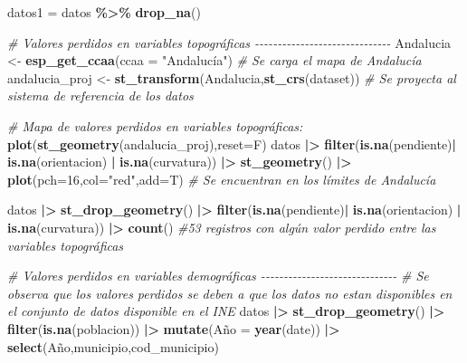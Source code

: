\documentclass[12pt,a4paper,]{book}
\newenvironment{Shaded}{\begin{snugshade}}{\end{snugshade}}
\newcommand{\AttributeTok}[1]{\textcolor[rgb]{0.13,0.29,0.53}{#1}}
\newcommand{\CommentTok}[1]{\textcolor[rgb]{0.56,0.35,0.01}{\textit{#1}}}
\newcommand{\DecValTok}[1]{\textcolor[rgb]{0.00,0.00,0.81}{#1}}
\newcommand{\FunctionTok}[1]{\textcolor[rgb]{0.13,0.29,0.53}{\textbf{#1}}}
\newcommand{\NormalTok}[1]{#1}
\newcommand{\OtherTok}[1]{\textcolor[rgb]{0.56,0.35,0.01}{#1}}
\newcommand{\SpecialCharTok}[1]{\textcolor[rgb]{0.81,0.36,0.00}{\textbf{#1}}}
\newcommand{\StringTok}[1]{\textcolor[rgb]{0.31,0.60,0.02}{#1}}
\numberwithin{dummy}{section}
\theoremstyle{ocrenumbox}
\theoremstyle{blacknumex}
\theoremstyle{blacknumbox}
\theoremstyle{ocrenum}
\theoremstyle{ocrenum}
\begin{document}
\begin{Shaded}
\begin{Highlighting}[]
\NormalTok{datos1 }\OtherTok{=}\NormalTok{ datos }\SpecialCharTok{\%\textgreater{}\%} \FunctionTok{drop\_na}\NormalTok{()}

\CommentTok{\# Valores perdidos en variables topográficas {-}{-}{-}{-}{-}{-}{-}{-}{-}{-}{-}{-}{-}{-}{-}{-}{-}{-}{-}{-}{-}{-}{-}{-}{-}{-}{-}{-}{-}{-}}
\NormalTok{Andalucia }\OtherTok{\textless{}{-}} \FunctionTok{esp\_get\_ccaa}\NormalTok{(}\AttributeTok{ccaa =} \StringTok{"Andalucía"}\NormalTok{) }\CommentTok{\# Se carga el mapa de Andalucía}
\NormalTok{andalucia\_proj }\OtherTok{\textless{}{-}} \FunctionTok{st\_transform}\NormalTok{(Andalucia,}\FunctionTok{st\_crs}\NormalTok{(dataset)) }\CommentTok{\# Se proyecta al sistema de referencia de los datos}

\CommentTok{\# Mapa de valores perdidos en variables topográficas:}
\FunctionTok{plot}\NormalTok{(}\FunctionTok{st\_geometry}\NormalTok{(andalucia\_proj),}\AttributeTok{reset=}\NormalTok{F)}
\NormalTok{datos }\SpecialCharTok{|\textgreater{}} 
  \FunctionTok{filter}\NormalTok{(}\FunctionTok{is.na}\NormalTok{(pendiente)}\SpecialCharTok{|} \FunctionTok{is.na}\NormalTok{(orientacion) }\SpecialCharTok{|} \FunctionTok{is.na}\NormalTok{(curvatura)) }\SpecialCharTok{|\textgreater{}} 
  \FunctionTok{st\_geometry}\NormalTok{() }\SpecialCharTok{|\textgreater{}} 
  \FunctionTok{plot}\NormalTok{(}\AttributeTok{pch=}\DecValTok{16}\NormalTok{,}\AttributeTok{col=}\StringTok{"red"}\NormalTok{,}\AttributeTok{add=}\NormalTok{T) }\CommentTok{\# Se encuentran en los límites de Andalucía}

\NormalTok{datos }\SpecialCharTok{|\textgreater{}} 
  \FunctionTok{st\_drop\_geometry}\NormalTok{() }\SpecialCharTok{|\textgreater{}} 
  \FunctionTok{filter}\NormalTok{(}\FunctionTok{is.na}\NormalTok{(pendiente)}\SpecialCharTok{|} \FunctionTok{is.na}\NormalTok{(orientacion) }\SpecialCharTok{|} \FunctionTok{is.na}\NormalTok{(curvatura)) }\SpecialCharTok{|\textgreater{}} 
  \FunctionTok{count}\NormalTok{() }\CommentTok{\#53 registros con algún valor perdido entre las variables topográficas}


\CommentTok{\# Valores perdidos en variables demográficas {-}{-}{-}{-}{-}{-}{-}{-}{-}{-}{-}{-}{-}{-}{-}{-}{-}{-}{-}{-}{-}{-}{-}{-}{-}{-}{-}{-}{-}{-}}
\CommentTok{\# Se observa que los valores perdidos se deben a que los datos no estan disponibles en el conjunto de datos disponible en el INE}
\NormalTok{datos }\SpecialCharTok{|\textgreater{}} 
  \FunctionTok{st\_drop\_geometry}\NormalTok{() }\SpecialCharTok{|\textgreater{}} 
  \FunctionTok{filter}\NormalTok{(}\FunctionTok{is.na}\NormalTok{(poblacion)) }\SpecialCharTok{|\textgreater{}} 
  \FunctionTok{mutate}\NormalTok{(Año }\OtherTok{=} \FunctionTok{year}\NormalTok{(date)) }\SpecialCharTok{|\textgreater{}} 
  \FunctionTok{select}\NormalTok{(Año,municipio,cod\_municipio)}


\end{Highlighting}
\end{Shaded}
\end{document}
